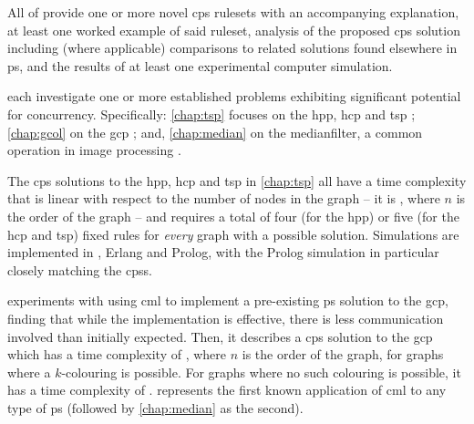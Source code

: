

All of  provide one or more novel \gls{cps} \glspl{ruleset} with an accompanying explanation, at least one worked example of said \gls{ruleset}, analysis of the proposed \gls{cps} solution including (where applicable) comparisons to related solutions found elsewhere in \gls{ps}, and the results of at least one experimental computer simulation.

 each investigate one or more established problems exhibiting significant potential for concurrency.  Specifically:  \cref{chap:tsp} focuses on the \gls{hpp}, \gls{hcp} and \gls{tsp} \cite{Applegate2006,Cook2012}; \cref{chap:gcol} on the \gls{gcp} \cite{Lewis2016}; and, \cref{chap:median} on the \gls{medianfilter}, a common operation in image processing \cite{Fisher2016,Gimelfarb2018}.

The \gls{cps} solutions to the \gls{hpp}, \gls{hcp} and \gls{tsp} in \cref{chap:tsp} all have a time complexity that is linear with respect to the number of nodes in the graph -- \ie{} it is , where \(n\) is the order of the graph -- and requires a total of four (for the \gls{hpp}) or five (for the \gls{hcp} and \gls{tsp}) fixed rules for \emph{every} graph with a possible solution.  Simulations are implemented in \fsharp{}, Erlang and Prolog, with the Prolog simulation in particular closely matching the \glspl{cps}.

 experiments with using \gls{cml} to implement a pre-existing \gls{ps} solution to the \gls{gcp}, finding that while the implementation is effective, there is less communication involved than initially expected.  Then, it describes a \gls{cps} solution to the \gls{gcp} which has a time complexity of , where \(n\) is the order of the graph, for graphs where a \(k\)-colouring is possible.  For graphs where no such colouring is possible, it has a time complexity of .   represents the first known application of \gls{cml} to any type of \gls{ps} (followed by \cref{chap:median} as the second).

